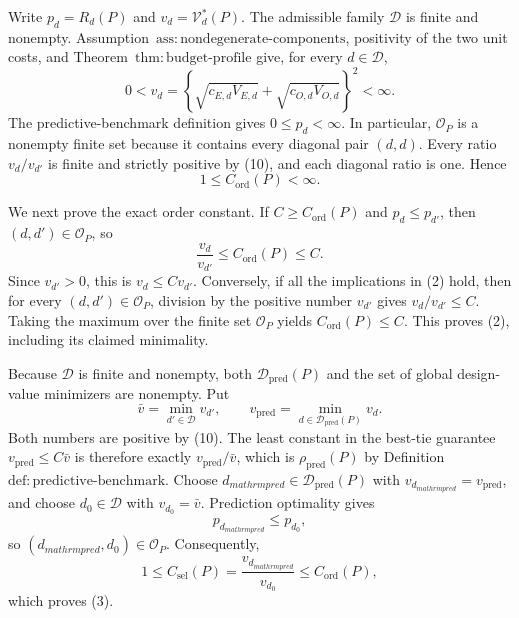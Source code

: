 Write \(p_d=R_d(P)\) and \(v_d=\mathcal V_d^*(P)\).  The admissible family \(\mathcal D\) is finite and nonempty.  Assumption~\(\mathrm{ass{:}nondegenerate\text{-}components}\), positivity of the two unit costs, and Theorem~\(\mathrm{thm{:}budget\text{-}profile}\) give, for every \(d\in\mathcal D\),
\[
  0<v_d
  =\left\{\sqrt{c_{E,d}V_{E,d}}+
             \sqrt{c_{O,d}V_{O,d}}\right\}^{2}<\infty.       \tag{10}
\]
The predictive-benchmark definition gives \(0\le p_d<\infty\).  In particular, \(\mathcal O_P\) is a nonempty finite set because it contains every diagonal pair \((d,d)\).  Every ratio \(v_d/v_{d'}\) is finite and strictly positive by (10), and each diagonal ratio is one.  Hence
\[
  1\le C_{\mathrm{ord}}(P)<\infty.                           \tag{11}
\]

We next prove the exact order constant.  If \(C\ge C_{\mathrm{ord}}(P)\) and \(p_d\le p_{d'}\), then \((d,d')\in\mathcal O_P\), so
\[
  \frac{v_d}{v_{d'}}\le C_{\mathrm{ord}}(P)\le C.
\]
Since \(v_{d'}>0\), this is \(v_d\le Cv_{d'}\).  Conversely, if all the implications in (2) hold, then for every \((d,d')\in\mathcal O_P\), division by the positive number \(v_{d'}\) gives \(v_d/v_{d'}\le C\).  Taking the maximum over the finite set \(\mathcal O_P\) yields \(C_{\mathrm{ord}}(P)\le C\).  This proves (2), including its claimed minimality.

Because \(\mathcal D\) is finite and nonempty, both \(\mathcal D_{\mathrm{pred}}(P)\) and the set of global design-value minimizers are nonempty.  Put
\[
  \bar v=\min_{d'\in\mathcal D}v_{d'},
  \qquad
  v_{\mathrm{pred}}=
  \min_{d\in\mathcal D_{\mathrm{pred}}(P)}v_d.
\]
Both numbers are positive by (10).  The least constant in the best-tie guarantee \(v_{\mathrm{pred}}\le C\bar v\) is therefore exactly \(v_{\mathrm{pred}}/\bar v\), which is \(\rho_{\mathrm{pred}}(P)\) by Definition~\(\mathrm{def{:}predictive\text{-}benchmark}\).  Choose \(d_{mathrm{pred}}\in\mathcal D_{\mathrm{pred}}(P)\) with \(v_{d_{mathrm{pred}}}=v_{\mathrm{pred}}\), and choose \(d_0\in\mathcal D\) with \(v_{d_0}=\bar v\).  Prediction optimality gives
\[
  p_{d_{mathrm{pred}}}\le p_{d_0},
\]
so \((d_{mathrm{pred}},d_0)\in\mathcal O_P\).  Consequently,
\[
  1\le C_{\mathrm{sel}}(P)
  =\frac{v_{d_{mathrm{pred}}}}{v_{d_0}}
  \le C_{\mathrm{ord}}(P),                                  \tag{12}
\]
which proves (3).

